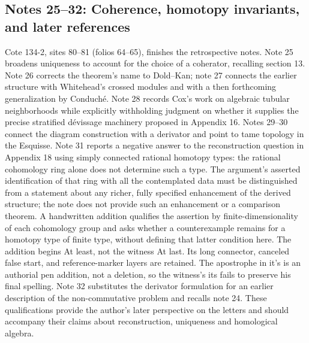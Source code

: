 \subsection*{Notes 25--32: Coherence, homotopy invariants, and later references}
Cote 134-2, sites 80--81 (folios 64--65), finishes the retrospective notes. Note 25 broadens uniqueness to account for the choice of a coherator, recalling section 13. Note 26 corrects the theorem's name to Dold--Kan; note 27 connects the earlier structure with Whitehead's crossed modules and with a then forthcoming generalization by Conduché. Note 28 records Cox's work on algebraic tubular neighborhoods while explicitly withholding judgment on whether it supplies the precise stratified dévissage machinery proposed in Appendix 16. Notes 29--30 connect the diagram construction with a derivator and point to tame topology in the Esquisse. Note 31 reports a negative answer to the reconstruction question in Appendix 18 using simply connected rational homotopy types: the rational cohomology ring alone does not determine such a type. The argument's asserted identification of that ring with all the contemplated data must be distinguished from a statement about any richer, fully specified enhancement of the derived structure; the note does not provide such an enhancement or a comparison theorem. A handwritten addition qualifies the assertion by finite-dimensionality of each cohomology group and asks whether a counterexample remains for a homotopy type of finite type, without defining that latter condition here. The addition begins At least, not the witness At last. Its long connector, canceled false start, and reference-marker layers are retained. The apostrophe in it's is an authorial pen addition, not a deletion, so the witness's its fails to preserve his final spelling. Note 32 substitutes the derivator formulation for an earlier description of the non-commutative problem and recalls note 24. These qualifications provide the author's later perspective on the letters and should accompany their claims about reconstruction, uniqueness and homological algebra.
